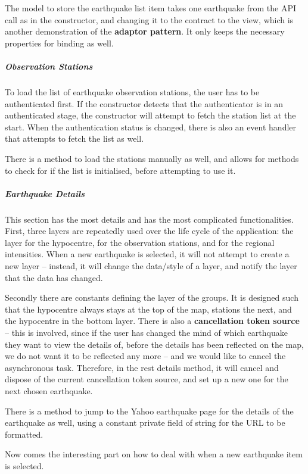 The model to store the earthquake list item takes one earthquake from the API call as in the constructor, and changing it to the contract to the view, which is another demonstration of the \textbf{adaptor pattern}. It only keeps the necessary properties for binding as well.

\subparagraph{Observation Stations}

To load the list of earthquake observation stations, the user has to be authenticated first. If the constructor detects that the authenticator is in an authenticated stage, the constructor will attempt to fetch the station list at the start. When the authentication status is changed, there is also an event handler that attempts to fetch the list as well.

There is a method to load the stations manually as well, and allows for methods to check for if the list is initialised, before attempting to use it.

\subparagraph{Earthquake Details}

This section has the most details and has the most complicated functionalities. First, three layers are repeatedly used over the life cycle of the application: the layer for the hypocentre, for the observation stations, and for the regional intensities. When a new earthquake is selected, it will not attempt to create a new layer -- instead, it will change the data/style of a layer, and notify the layer that the data has changed.

Secondly there are constants defining the layer of the groups. It is designed such that the hypocentre always stays at the top of the map, stations the next, and the hypocentre in the bottom layer. There is also a \textbf{cancellation token source} -- this is involved, since if the user has changed the mind of which earthquake they want to view the details of, before the details has been reflected on the map, we do not want it to be reflected any more -- and we would like to cancel the asynchronous task. Therefore, in the rest details method, it will cancel and dispose of the current cancellation token source, and set up a new one for the next chosen earthquake.

There is a method to jump to the Yahoo earthquake page for the details of the earthquake as well, using a constant private field of string for the URL to be formatted.

Now comes the interesting part on how to deal with when a new earthquake item is selected.

